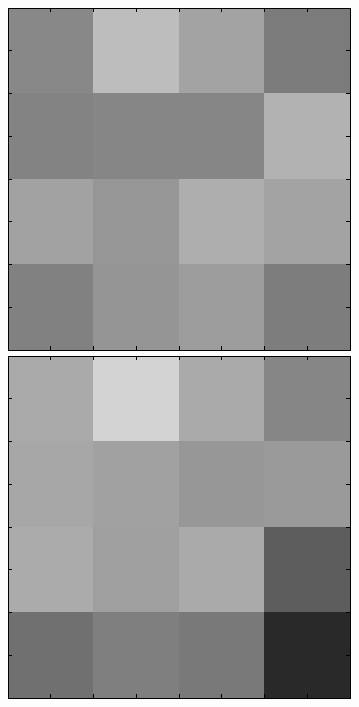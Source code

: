 \begin{figure}[ht]
 \includegraphics[width=\textwidth*11/100]{ch5/figures/XM2VTS_4_3.png}
 \includegraphics[width=\textwidth*11/100]{ch5/figures/XM2VTS_5_3.png}

\end{figure}
